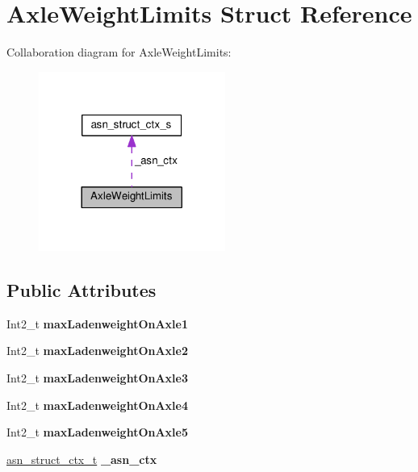 \hypertarget{structAxleWeightLimits}{}\section{Axle\+Weight\+Limits Struct Reference}
\label{structAxleWeightLimits}


Collaboration diagram for Axle\+Weight\+Limits\+:\nopagebreak
\begin{figure}[H]
\begin{center}
\leavevmode
\includegraphics[width=173pt]{structAxleWeightLimits__coll__graph}
\end{center}
\end{figure}
\subsection*{Public Attributes}
\begin{DoxyCompactItemize}
\item 
Int2\+\_\+t {\bfseries max\+Ladenweight\+On\+Axle1}\hypertarget{structAxleWeightLimits_ae786bb78361773b06e7b09fa77090d06}{}\label{structAxleWeightLimits_ae786bb78361773b06e7b09fa77090d06}

\item 
Int2\+\_\+t {\bfseries max\+Ladenweight\+On\+Axle2}\hypertarget{structAxleWeightLimits_a0f76443b641175173acb823c71e8a56e}{}\label{structAxleWeightLimits_a0f76443b641175173acb823c71e8a56e}

\item 
Int2\+\_\+t {\bfseries max\+Ladenweight\+On\+Axle3}\hypertarget{structAxleWeightLimits_ab889c72a9015f6f184644fe4616176a0}{}\label{structAxleWeightLimits_ab889c72a9015f6f184644fe4616176a0}

\item 
Int2\+\_\+t {\bfseries max\+Ladenweight\+On\+Axle4}\hypertarget{structAxleWeightLimits_a558e61dcae006b24b9a0a575ce5a5779}{}\label{structAxleWeightLimits_a558e61dcae006b24b9a0a575ce5a5779}

\item 
Int2\+\_\+t {\bfseries max\+Ladenweight\+On\+Axle5}\hypertarget{structAxleWeightLimits_a84e049c5ebe1d7d9f942d3eeb4e319e3}{}\label{structAxleWeightLimits_a84e049c5ebe1d7d9f942d3eeb4e319e3}

\item 
\hyperlink{structasn__struct__ctx__s}{asn\+\_\+struct\+\_\+ctx\+\_\+t} {\bfseries \+\_\+asn\+\_\+ctx}\hypertarget{structAxleWeightLimits_af23bd9bea4371695528ec37a7eebc28e}{}\label{structAxleWeightLimits_af23bd9bea4371695528ec37a7eebc28e}

\end{DoxyCompactItemize}


